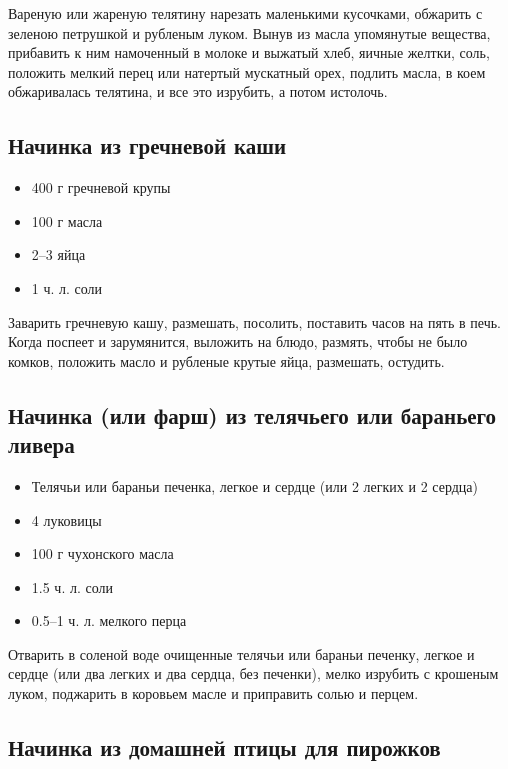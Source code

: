 Вареную или жареную телятину нарезать маленькими кусочками, обжарить с зеленою петрушкой и рубленым луком. Вынув из масла упомянутые вещества, прибавить к ним намоченный в молоке и выжатый хлеб, яичные желтки, соль, положить мелкий перец или натертый мускатный орех, подлить масла, в коем обжаривалась телятина, и все это изрубить, а потом истолочь.

\subsection{Начинка из гречневой каши}

\begin{itemize}
	\item 400 г гречневой крупы 
    \item 100 г масла
    \item 2–3 яйца 
    \item 1 ч. л. соли
\end{itemize}

Заварить гречневую кашу, размешать, посолить, поставить часов на пять в печь. Когда поспеет и зарумянится, выложить на блюдо, размять, чтобы не было комков, положить масло и рубленые крутые яйца, размешать, остудить.

\subsection{Начинка (или фарш) из телячьего или бараньего ливера}

\begin{itemize}
	\item Телячьи или бараньи печенка, легкое и сердце (или 2 легких и 2 сердца)
    \item 4 луковицы
    \item 100 г чухонского масла 
    \item 1.5 ч. л. соли 
    \item 0.5–1 ч. л. мелкого перца
\end{itemize}

Отварить в соленой воде очищенные телячьи или бараньи печенку, легкое и сердце (или два легких и два сердца, без печенки), мелко изрубить с крошеным луком, поджарить в коровьем масле и приправить солью и перцем.

\subsection{Начинка из домашней птицы для пирожков}

